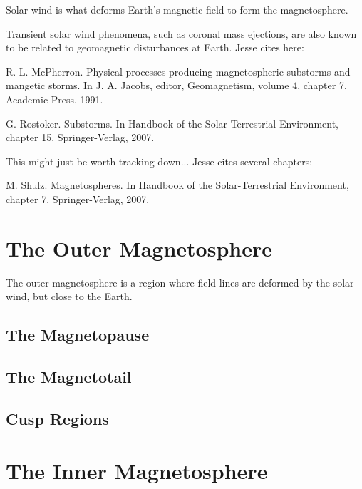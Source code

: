Solar wind is what deforms Earth's magnetic field to form the magnetosphere. 

Transient solar wind phenomena, such as coronal mass ejections, are also known to be related to geomagnetic disturbances at Earth. Jesse cites here: 

R. L. McPherron. Physical processes producing magnetospheric substorms and mangetic storms. In J. A. Jacobs, editor, Geomagnetism, volume 4, chapter 7. Academic Press, 1991.

G. Rostoker. Substorms. In Handbook of the Solar-Terrestrial Environment, chapter 15. Springer-Verlag, 2007.

This might just be worth tracking down... Jesse cites several chapters: 

M. Shulz. Magnetospheres. In Handbook of the Solar-Terrestrial Environment, chapter 7. Springer-Verlag, 2007.





\section{The Outer Magnetosphere}

The outer magnetosphere is a region where field lines are deformed by the solar wind, but close to the Earth. 

\subsection{The Magnetopause}

\subsection{The Magnetotail}

\subsection{Cusp Regions}

\section{The Inner Magnetosphere}

